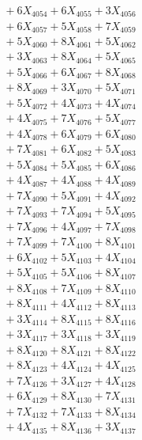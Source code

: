 \documentclass[a4paper,10pt]{article}
\begin{document}
{\begin{align}
&\;  + 6 X_{4054} + 6 X_{4055} + 3 X_{4056} \\[0.3ex]
&\;  + 6 X_{4057} + 5 X_{4058} + 7 X_{4059} \\[0.5ex]\allowbreak
&\;  + 5 X_{4060} + 8 X_{4061} + 5 X_{4062} \\[0.3ex]
&\;  + 3 X_{4063} + 8 X_{4064} + 5 X_{4065} \\[0.3ex]
&\;  + 5 X_{4066} + 6 X_{4067} + 8 X_{4068} \\[0.3ex]
&\;  + 8 X_{4069} + 3 X_{4070} + 5 X_{4071} \\[0.3ex]
&\;  + 5 X_{4072} + 4 X_{4073} + 4 X_{4074} \\[0.3ex]
&\;  + 4 X_{4075} + 7 X_{4076} + 5 X_{4077} \\[0.3ex]
&\;  + 4 X_{4078} + 6 X_{4079} + 6 X_{4080} \\[0.3ex]
&\;  + 7 X_{4081} + 6 X_{4082} + 5 X_{4083} \\[0.3ex]
&\;  + 5 X_{4084} + 5 X_{4085} + 6 X_{4086} \\[0.3ex]
&\;  + 4 X_{4087} + 4 X_{4088} + 4 X_{4089} \\[0.5ex]\allowbreak
&\;  + 7 X_{4090} + 5 X_{4091} + 4 X_{4092} \\[0.3ex]
&\;  + 7 X_{4093} + 7 X_{4094} + 5 X_{4095} \\[0.3ex]
&\;  + 7 X_{4096} + 4 X_{4097} + 7 X_{4098} \\[0.3ex]
&\;  + 7 X_{4099} + 7 X_{4100} + 8 X_{4101} \\[0.3ex]
&\;  + 6 X_{4102} + 5 X_{4103} + 4 X_{4104} \\[0.3ex]
&\;  + 5 X_{4105} + 5 X_{4106} + 8 X_{4107} \\[0.3ex]
&\;  + 8 X_{4108} + 7 X_{4109} + 8 X_{4110} \\[0.3ex]
&\;  + 8 X_{4111} + 4 X_{4112} + 8 X_{4113} \\[0.3ex]
&\;  + 3 X_{4114} + 8 X_{4115} + 8 X_{4116} \\[0.3ex]
&\;  + 3 X_{4117} + 3 X_{4118} + 3 X_{4119} \\[0.5ex]\allowbreak
&\;  + 8 X_{4120} + 8 X_{4121} + 8 X_{4122} \\[0.3ex]
&\;  + 8 X_{4123} + 4 X_{4124} + 4 X_{4125} \\[0.3ex]
&\;  + 7 X_{4126} + 3 X_{4127} + 4 X_{4128} \\[0.3ex]
&\;  + 6 X_{4129} + 8 X_{4130} + 7 X_{4131} \\[0.3ex]
&\;  + 7 X_{4132} + 7 X_{4133} + 8 X_{4134} \\[0.3ex]
&\;  + 4 X_{4135} + 8 X_{4136} + 3 X_{4137} \\[0.3ex]

\end{align}}
\end{document}
